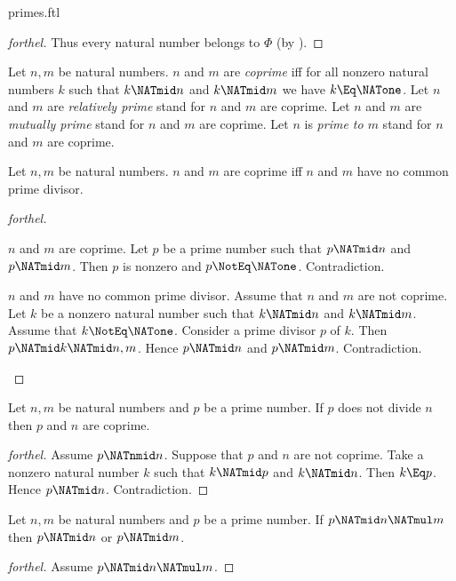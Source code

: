 \documentclass{stex}
\begin{document}
\begin{smodule}{primes.ftl}
\begin{proof}[forthel]
  Thus every natural number belongs to $\Phi$ (by ).
\end{proof}

\begin{definition}[forthel]
  Let $n, m$ be natural numbers.
  $n$ and $m$ are \emph{coprime} iff for all nonzero natural numbers $k$ such that $k \NATmid n$ and $k \NATmid m$ we have $k \Eq \NATone$.
  Let $n$ and $m$ are \emph{relatively prime} stand for $n$ and $m$ are coprime.
  Let $n$ and $m$ are \emph{mutually prime} stand for $n$ and $m$ are coprime.
  Let $n$ is \emph{prime to $m$} stand for $n$ and $m$ are coprime.
\end{definition}

\begin{proposition}[forthel]
  Let $n, m$ be natural numbers.
  $n$ and $m$ are coprime iff $n$ and $m$ have no common prime divisor.
\end{proposition}
\begin{proof}[forthel]
  \begin{case}{$n$ and $m$ are coprime.}
    Let $p$ be a prime number such that $p \NATmid n$ and $p \NATmid m$.
    Then $p$ is nonzero and $p \NotEq \NATone$.
    Contradiction.
  \end{case}

  \begin{case}{$n$ and $m$ have no common prime divisor.}
    Assume that $n$ and $m$ are not coprime.
    Let $k$ be a nonzero natural number such that $k \NATmid n$ and $k \NATmid m$.
    Assume that $k \NotEq \NATone$.
    Consider a prime divisor $p$ of $k$.
    Then $p \NATmid k \NATmid n,m$.
    Hence $p \NATmid n$ and $p \NATmid m$.
    Contradiction.
  \end{case}
\end{proof}

\begin{proposition}[forthel]
  Let $n, m$ be natural numbers and $p$ be a prime number.
  If $p$ does not divide $n$ then $p$ and $n$ are coprime.
\end{proposition}
\begin{proof}[forthel]
  Assume $p \NATnmid n$.
  Suppose that $p$ and $n$ are not coprime.
  Take a nonzero natural number $k$ such that $k \NATmid p$ and $k \NATmid n$.
  Then $k \Eq p$.
  Hence $p \NATmid n$.
  Contradiction.
\end{proof}

\begin{proposition}[forthel]
  Let $n, m$ be natural numbers and $p$ be a prime number.
  If $p \NATmid n \NATmul m$ then $p \NATmid n$ or $p \NATmid m$.
\end{proposition}
\begin{proof}[forthel]
  Assume $p \NATmid n \NATmul m$.


\end{proof}
\end{smodule}
\end{document}
